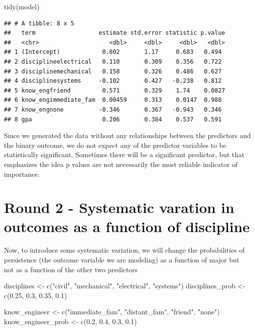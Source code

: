 \documentclass[
]{book}
\newenvironment{Shaded}{\begin{snugshade}}{\end{snugshade}}
\newcommand{\FloatTok}[1]{\textcolor[rgb]{0.00,0.00,0.81}{#1}}
\newcommand{\FunctionTok}[1]{\textcolor[rgb]{0.00,0.00,0.00}{#1}}
\newcommand{\NormalTok}[1]{#1}
\newcommand{\OtherTok}[1]{\textcolor[rgb]{0.56,0.35,0.01}{#1}}
\newcommand{\StringTok}[1]{\textcolor[rgb]{0.31,0.60,0.02}{#1}}
\begin{document}
\begin{Shaded}
\begin{Highlighting}[]
\FunctionTok{tidy}\NormalTok{(model)}
\end{Highlighting}
\end{Shaded}

\begin{verbatim}
## # A tibble: 8 x 5
##   term                  estimate std.error statistic p.value
##   <chr>                    <dbl>     <dbl>     <dbl>   <dbl>
## 1 (Intercept)            0.802       1.17     0.683   0.494 
## 2 disciplineelectrical   0.110       0.309    0.356   0.722 
## 3 disciplinemechanical   0.158       0.326    0.486   0.627 
## 4 disciplinesystems     -0.102       0.427   -0.238   0.812 
## 5 know_engfriend         0.571       0.329    1.74    0.0827
## 6 know_engimmediate_fam  0.00459     0.313    0.0147  0.988 
## 7 know_engnone          -0.346       0.367   -0.943   0.346 
## 8 gpa                    0.206       0.384    0.537   0.591
\end{verbatim}

Since we generated the data without any relationships between the predictors and the binary outcome, we do not expect any of the predictor variables to be statistically significant. Sometimes there will be a significant predictor, but that emphasizes the idea p values are not necessarily the most reliable indicator of importance.

\hypertarget{round-2---systematic-varation-in-outcomes-as-a-function-of-discipline}{%
\section{Round 2 - Systematic varation in outcomes as a function of discipline}\label{round-2---systematic-varation-in-outcomes-as-a-function-of-discipline}}

Now, to introduce some systematic variation, we will change the probabilities of persistence (the outcome variable we are modeling) as a function of major but not as a function of the other two predictors

\begin{Shaded}
\begin{Highlighting}[]
\NormalTok{disciplines }\OtherTok{\textless{}{-}} \FunctionTok{c}\NormalTok{(}\StringTok{"civil"}\NormalTok{, }\StringTok{"mechanical"}\NormalTok{, }\StringTok{"electrical"}\NormalTok{, }\StringTok{"systems"}\NormalTok{)}
\NormalTok{disciplines\_prob }\OtherTok{\textless{}{-}} \FunctionTok{c}\NormalTok{(}\FloatTok{0.25}\NormalTok{, }\FloatTok{0.3}\NormalTok{, }\FloatTok{0.35}\NormalTok{, }\FloatTok{0.1}\NormalTok{)}


\NormalTok{know\_engineer }\OtherTok{\textless{}{-}} \FunctionTok{c}\NormalTok{(}\StringTok{"immediate\_fam"}\NormalTok{, }\StringTok{"distant\_fam"}\NormalTok{, }\StringTok{"friend"}\NormalTok{, }\StringTok{"none"}\NormalTok{)}
\NormalTok{know\_engineer\_prob }\OtherTok{\textless{}{-}} \FunctionTok{c}\NormalTok{(}\FloatTok{0.2}\NormalTok{, }\FloatTok{0.4}\NormalTok{, }\FloatTok{0.3}\NormalTok{, }\FloatTok{0.1}\NormalTok{)}
\end{Highlighting}
\end{Shaded}
\end{document}
